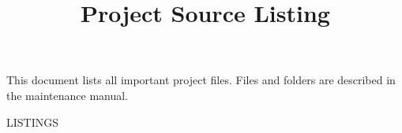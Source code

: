 \documentclass{article}
\title{Project Source Listing}
\date{}
\begin{document}
  \maketitle
  This document lists all important project files. Files and folders are described in the maintenance manual.
  \pagebreak

LISTINGS
\end{document}
